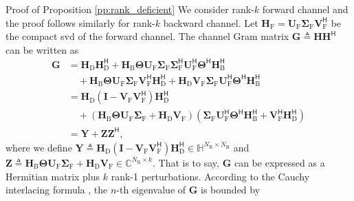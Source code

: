 \documentclass[journal]{IEEEtran}
\begin{document}
\begin{appendix}
	\begin{subsection}{Proof of Proposition \ref{pp:rank_deficient}}\label{ap:rank_deficient}
		We consider rank-$k$ forward channel and the proof follows similarly for rank-$k$ backward channel.
		Let $\mathbf{H}_\mathrm{F} = \mathbf{U}_\mathrm{F} \mathbf{\Sigma}_\mathrm{F} \mathbf{V}_\mathrm{F}^\mathsf{H}$ be the compact \gls{svd} of the forward channel.
		The channel Gram matrix $\mathbf{G} \triangleq \mathbf{H} \mathbf{H}^\mathsf{H} $ can be written as
		\begin{equation*}
			\begin{split}
				\mathbf{G}
				& = \mathbf{H}_\mathrm{D} \mathbf{H}_\mathrm{D}^\mathsf{H} + \mathbf{H}_\mathrm{B} \mathbf{\Theta} \mathbf{U}_\mathrm{F} \mathbf{\Sigma}_\mathrm{F} \mathbf{\Sigma}_\mathrm{F}^\mathsf{H} \mathbf{U}_\mathrm{F}^\mathsf{H} \mathbf{\Theta}^\mathsf{H} \mathbf{H}_\mathrm{B}^\mathsf{H} \\
				& \quad + \mathbf{H}_\mathrm{B} \mathbf{\Theta} \mathbf{U}_\mathrm{F} \mathbf{\Sigma}_\mathrm{F} \mathbf{V}_\mathrm{F}^\mathsf{H} \mathbf{H}_\mathrm{D}^\mathsf{H} + \mathbf{H}_\mathrm{D} \mathbf{V}_\mathrm{F} \mathbf{\Sigma}_\mathrm{F} \mathbf{U}_\mathrm{F}^\mathsf{H} \mathbf{\Theta}^\mathsf{H} \mathbf{H}_\mathrm{B}^\mathsf{H} \\
				& = \mathbf{H}_\mathrm{D} (\mathbf{I} - \mathbf{V}_\mathrm{F} \mathbf{V}_\mathrm{F}^\mathsf{H}) \mathbf{H}_\mathrm{D}^\mathsf{H} \\
				& \quad + (\mathbf{H}_\mathrm{B} \mathbf{\Theta} \mathbf{U}_\mathrm{F} \mathbf{\Sigma}_\mathrm{F} + \mathbf{H}_\mathrm{D} \mathbf{V}_\mathrm{F}) (\mathbf{\Sigma}_\mathrm{F} \mathbf{U}_\mathrm{F}^\mathsf{H} \mathbf{\Theta}^\mathsf{H} \mathbf{H}_\mathrm{B}^\mathsf{H} + \mathbf{V}_\mathrm{F}^\mathsf{H} \mathbf{H}_\mathrm{D}^\mathsf{H}) \\
				& = \mathbf{Y} + \mathbf{Z} \mathbf{Z}^\mathsf{H},
			\end{split}
		\end{equation*}
		where we define $\mathbf{Y} \triangleq \mathbf{H}_\mathrm{D} (\mathbf{I} - \mathbf{V}_\mathrm{F} \mathbf{V}_\mathrm{F}^\mathsf{H}) \mathbf{H}_\mathrm{D}^\mathsf{H} \in \mathbb{H}^{N_\mathrm{R} \times N_\mathrm{R}}$ and $\mathbf{Z} \triangleq \mathbf{H}_\mathrm{B} \mathbf{\Theta} \mathbf{U}_\mathrm{F} \mathbf{\Sigma}_\mathrm{F} + \mathbf{H}_\mathrm{D} \mathbf{V}_\mathrm{F} \in \mathbb{C}^{N_\mathrm{R} \times k}$.
		That is to say, $\mathbf{G}$ can be expressed as a Hermitian matrix plus $k$ rank-1 perturbations.
		According to the Cauchy interlacing formula \cite{Golub2013}, the $n$-th eigenvalue of $\mathbf{G}$ is bounded by

\end{subsection}
\end{appendix}
\end{document}
